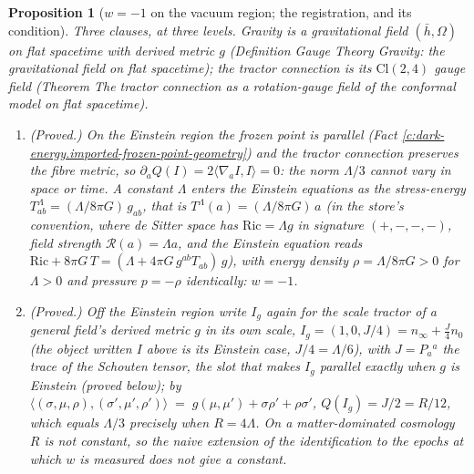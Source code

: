 \documentclass[11pt]{article}
\newtheorem{proposition}[theorem]{Proposition}
\theoremstyle{definition}
\theoremstyle{plain}
\newcommand{\changedmark}[2]{\marginpar{\raggedright\scriptsize\color{#1}#2}}
\providecommand{\Cl}{}\renewcommand{\Cl}{\mathrm{Cl}}
\providecommand{\Ric}{}\renewcommand{\Ric}{\mathrm{Ric}}
\providecommand{\hb}{}\renewcommand{\hb}{\bar{h}}
\providecommand{\nInf}{}\renewcommand{\nInf}{n_\infty}
\providecommand{\nO}{}\renewcommand{\nO}{n_0}
\providecommand{\ip}{}\renewcommand{\ip}[2]{\langle #1, #2\rangle}
\begin{document}
\begin{proposition}[$w = -1$ on the vacuum region; the registration, and its condition]\label{c:dark-energy.vacuum-region-registration-condition}
\changedmark{BrickRed}{corrected since the deposit}
Three clauses, at three levels. Gravity is a gravitational field $(\hb, \Omega)$ on flat spacetime with derived metric $g$ (Definition \emph{Gauge Theory Gravity: the gravitational field on flat spacetime}); the tractor connection is its $\Cl(2,4)$ gauge field (Theorem \emph{The tractor connection as a rotation-gauge field of the conformal model on flat spacetime}).
\begin{enumerate}
\item[(i)] \emph{(Proved.)} On the Einstein region the frozen point is parallel (Fact \ref{c:dark-energy.imported-frozen-point-geometry}) and the tractor connection preserves the fibre metric, so $\partial_aQ(I) = 2\ip{\nabla_a I}{I} = 0$: the norm $\Lambda/3$ cannot vary in space or time. A constant $\Lambda$ enters the Einstein equations as the stress-energy $T^{\Lambda}_{ab} = (\Lambda/8\pi G)\,g_{ab}$, that is $T^{\Lambda}(a) = (\Lambda/8\pi G)\,a$ (in the store's convention, where de Sitter space has $\Ric = \Lambda g$ in signature $(+,-,-,-)$, field strength $\mathcal{R}(a) = \Lambda a$, and the Einstein equation reads $\Ric + 8\pi G\,T = (\Lambda + 4\pi G\,g^{ab}T_{ab})\,g$), with energy density $\rho = \Lambda/8\pi G > 0$ for $\Lambda > 0$ and pressure $p = -\rho$ identically: $w = -1$.
\item[(ii)] \emph{(Proved.)} Off the Einstein region write $I_g$ again for the scale tractor of a general field's derived metric $g$ in its own scale, $I_g = (1, 0, J/4) = \nInf + \tfrac{J}{4}\nO$ (the object written $I$ above is its Einstein case, $J/4 = \Lambda/6$), with $J = P_a{}^a$ the trace of the Schouten tensor, the slot that makes $I_g$ parallel exactly when $g$ is Einstein (proved below); by $\ip{(\sigma,\mu,\rho)}{(\sigma',\mu',\rho')} \;=\; g(\mu,\mu') + \sigma\rho' + \rho\sigma'$, $Q(I_g) = J/2 = R/12$, which equals $\Lambda/3$ precisely when $R = 4\Lambda$. On a matter-dominated cosmology $R$ is not constant, so the naive extension of the identification to the epochs at which $w$ is measured does not give a constant.

\end{enumerate}
\end{proposition}
\end{document}
